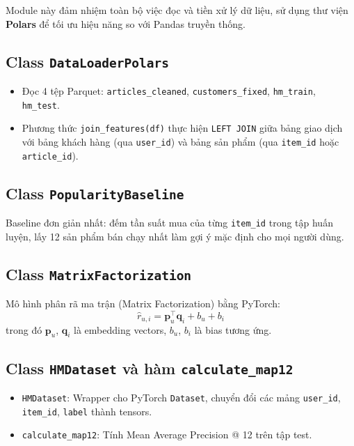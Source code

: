 \documentclass[12pt,a4paper]{article}
\begin{document}
Module này đảm nhiệm toàn bộ việc đọc và tiền xử lý dữ liệu, sử dụng thư viện
\textbf{Polars} để tối ưu hiệu năng so với Pandas truyền thống.

\subsection{Class \texttt{DataLoaderPolars}}

\begin{itemize}[leftmargin=2em]
    \item Đọc 4 tệp Parquet: \texttt{articles\_cleaned}, \texttt{customers\_fixed},
          \texttt{hm\_train}, \texttt{hm\_test}.
    \item Phương thức \texttt{join\_features(df)} thực hiện \texttt{LEFT JOIN}
          giữa bảng giao dịch với bảng khách hàng (qua \texttt{user\_id}) và
          bảng sản phẩm (qua \texttt{item\_id} hoặc \texttt{article\_id}).
\end{itemize}

\subsection{Class \texttt{PopularityBaseline}}

Baseline đơn giản nhất: đếm tần suất mua của từng \texttt{item\_id} trong tập
huấn luyện, lấy 12 sản phẩm bán chạy nhất làm gợi ý mặc định cho mọi người dùng.

\subsection{Class \texttt{MatrixFactorization}}

Mô hình phân rã ma trận (Matrix Factorization) bằng PyTorch:
\begin{equation}
    \hat{r}_{u,i} = \mathbf{p}_u^{\top} \mathbf{q}_i + b_u + b_i
\end{equation}
trong đó $\mathbf{p}_u$, $\mathbf{q}_i$ là embedding vectors,
$b_u$, $b_i$ là bias tương ứng.

\subsection{Class \texttt{HMDataset} và hàm \texttt{calculate\_map12}}

\begin{itemize}[leftmargin=2em]
    \item \texttt{HMDataset}: Wrapper cho PyTorch \texttt{Dataset},
          chuyển đổi các mảng \texttt{user\_id}, \texttt{item\_id}, \texttt{label}
          thành tensors.
    \item \texttt{calculate\_map12}: Tính Mean Average Precision @ 12
          trên tập test.
\end{itemize}
\end{document}
